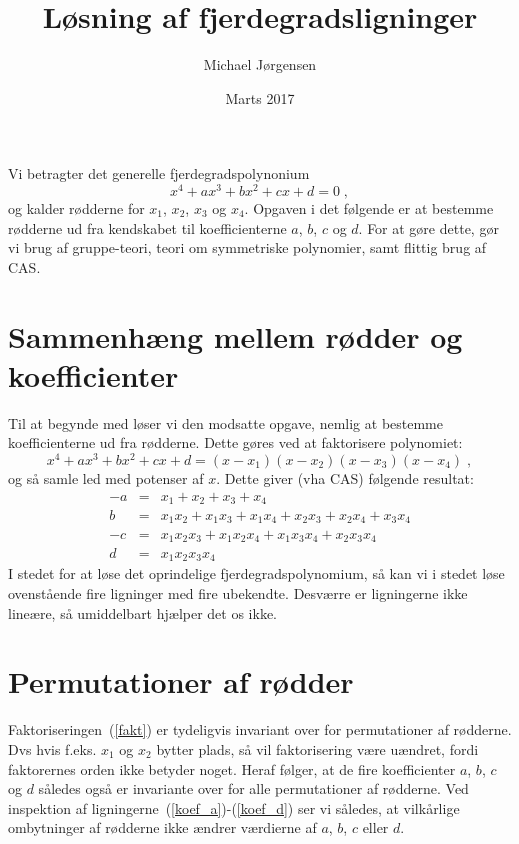 \documentclass[12pt,oneside,a4paper]{article}
\title{Løsning af fjerdegradsligninger}
\date{Marts 2017}
\author{Michael Jørgensen}
\newcommand{\bea}{\begin{eqnarray}}
\newcommand{\eea}{\end{eqnarray}}
\begin{document}
\maketitle
Vi betragter det generelle fjerdegradspolynonium
\begin{equation}
    x^4 + ax^3 + bx^2 + cx + d = 0\;,
\end{equation}
og kalder rødderne for $x_1$, $x_2$, $x_3$ og $x_4$.
Opgaven i det følgende er at bestemme rødderne ud fra kendskabet til
koefficienterne $a$, $b$, $c$ og $d$.
For at gøre dette, gør vi brug af gruppe-teori, teori om
symmetriske polynomier, samt flittig brug af CAS.

\section{Sammenhæng mellem rødder og koefficienter}
Til at begynde med løser vi den modsatte opgave, nemlig at bestemme
koefficienterne ud fra rødderne. Dette gøres ved at faktorisere polynomiet:
\begin{equation}
    x^4 + ax^3 + bx^2 + cx + d = (x-x_1)(x-x_2)(x-x_3)(x-x_4)\;,
    \label{fakt}
\end{equation}
og så samle led med potenser af $x$.
Dette giver (vha CAS) følgende resultat:
\bea
  -a &=& x_1 + x_2 + x_3 + x_4 \label{koef_a} \\
   b &=& x_1x_2 + x_1x_3 + x_1x_4 + x_2x_3 + x_2x_4 + x_3x_4  \label{koef_b}\\
  -c &=& x_1x_2x_3 + x_1x_2x_4 + x_1x_3x_4 + x_2x_3x_4  \label{koef_c}\\
   d &=& x_1x_2x_3x_4 \label{koef_d}
\eea
I stedet for at løse det oprindelige fjerdegradspolynomium, så kan vi i stedet løse ovenstående fire ligninger med fire ubekendte. Desværre er ligningerne ikke lineære, så umiddelbart hjælper det os ikke.

\section{Permutationer af rødder}
Faktoriseringen~(\ref{fakt}) er tydeligvis invariant over for permutationer af
rødderne. Dvs hvis f.eks. $x_1$ og $x_2$ bytter plads, så vil faktorisering være
uændret, fordi faktorernes orden ikke betyder noget.
Heraf følger, at de fire koefficienter $a$, $b$, $c$ og $d$ således også er
invariante over for alle permutationer af rødderne. Ved inspektion af
ligningerne~(\ref{koef_a})-(\ref{koef_d}) ser vi således, at vilkårlige
ombytninger af rødderne ikke ændrer værdierne af $a$, $b$, $c$ eller $d$.
\end{document}

